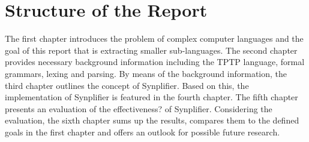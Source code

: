 \section{Structure of the Report}\label{sec:IntroductionStructure}
The first chapter introduces the problem of complex computer languages and the goal of this report that is extracting smaller sub-languages.
The second chapter provides necessary background information including the \ac{TPTP} language, formal grammars, lexing and parsing. By means of the background information, the third chapter outlines the concept of \ac{Synplifier}.
Based on this, the implementation of \ac{Synplifier} is featured in the fourth chapter.
The fifth chapter presents an evaluation of the effectiveness? of \ac{Synplifier}. Considering the evaluation, the sixth chapter sums up the results, compares them to the defined goals in the first chapter and offers an outlook for possible future research.